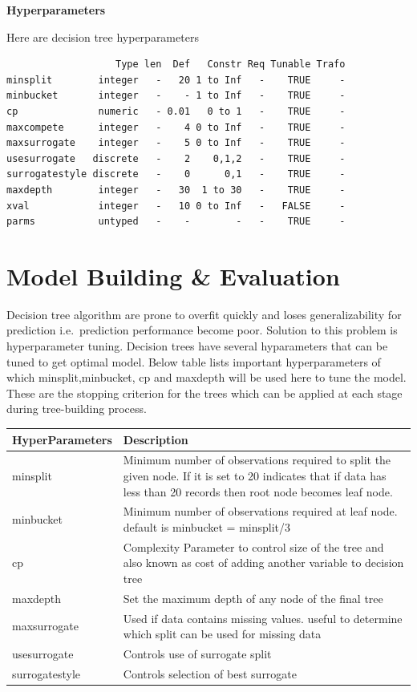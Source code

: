 \documentclass[
]{article}
\begin{document}
\textbf{Hyperparameters}

Here are decision tree hyperparameters

\begin{verbatim}
                   Type len  Def   Constr Req Tunable Trafo
minsplit        integer   -   20 1 to Inf   -    TRUE     -
minbucket       integer   -    - 1 to Inf   -    TRUE     -
cp              numeric   - 0.01   0 to 1   -    TRUE     -
maxcompete      integer   -    4 0 to Inf   -    TRUE     -
maxsurrogate    integer   -    5 0 to Inf   -    TRUE     -
usesurrogate   discrete   -    2    0,1,2   -    TRUE     -
surrogatestyle discrete   -    0      0,1   -    TRUE     -
maxdepth        integer   -   30  1 to 30   -    TRUE     -
xval            integer   -   10 0 to Inf   -   FALSE     -
parms           untyped   -    -        -   -    TRUE     -
\end{verbatim}

\newpage

\hypertarget{model-building-evaluation}{%
\section{Model Building \& Evaluation}\label{model-building-evaluation}}

Decision tree algorithm are prone to overfit quickly and loses
generalizability for prediction i.e.~prediction performance become poor.
Solution to this problem is hyperparameter tuning. Decision trees have
several hyparameters that can be tuned to get optimal model. Below table
lists important hyperparameters of which minsplit,minbucket, cp and
maxdepth will be used here to tune the model. These are the stopping
criterion for the trees which can be applied at each stage during
tree-building process.

\begin{table}[H]
\centering
\begin{tabular}[t]{l>{\raggedright\arraybackslash}p{30em}}
\toprule
HyperParameters & Description\\
\midrule
minsplit & Minimum number of observations required to split the given node. If it is set to 20 indicates that if data has less than 20 records then root node becomes leaf
                   node.\\
minbucket & Minimum number of observations required at leaf node. default is minbucket = minsplit/3\\
cp & Complexity Parameter to control size of the tree and also known as cost of adding another variable to decision tree\\
maxdepth & Set the maximum depth of any node of the final tree\\
maxsurrogate & Used if data contains missing values. useful to determine which split can be used for missing data\\
\addlinespace
usesurrogate & Controls use of surrogate split\\
surrogatestyle & Controls selection of best surrogate\\
\bottomrule
\end{tabular}
\end{table}
\end{document}
